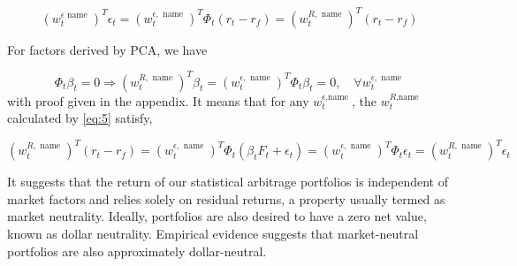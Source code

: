 \documentclass[12pt,article]{memoir}
\begin{document}
\begin{equation}\label{eq:6}
	\left(w_t^{\epsilon \text { name }}\right)^T \epsilon_t=\left(w_t^{\epsilon, \text { name }}\right)^T \Phi_t\left(r_t-r_f\right)=\left(w_t^{R, \text { name }}\right)^T\left(r_t-r_f\right)
\end{equation}

For factors derived by PCA, we have

\begin{equation}\label{eq:7}
	\Phi_t \beta_t=0 \Longrightarrow\left(w_t^{R, \text { name }}\right)^T \beta_t=\left(w_t^{\epsilon, \text { name }}\right)^T \Phi_t \beta_t=0, \quad \forall w_t^{\epsilon, \text { name }}
\end{equation}
with proof given in the appendix. It means that for any $w_t^{\epsilon \text {,name }}$, the $w_t^{R \text {,name }}$ calculated by \cref{eq:5} satisfy,

\begin{equation}\label{eq:8}
	\left(w_t^{R, \text { name }}\right)^T\left(r_t-r_f\right)=\left(w_t^{\epsilon, \text { name }}\right)^T \Phi_t\left(\beta_t F_t+\epsilon_t\right)=\left(w_t^{\epsilon, \text { name }}\right)^T \Phi_t \epsilon_t=\left(w_t^{R, \text { name }}\right)^T \epsilon_t
\end{equation}

It suggests that the return of our statistical arbitrage portfolios is independent of market factors and relies solely on residual returns, a property usually termed as market neutrality. Ideally, portfolios are also desired to have a zero net value, known as dollar neutrality. Empirical evidence suggests that market-neutral portfolios are also approximately dollar-neutral.
\end{document}
